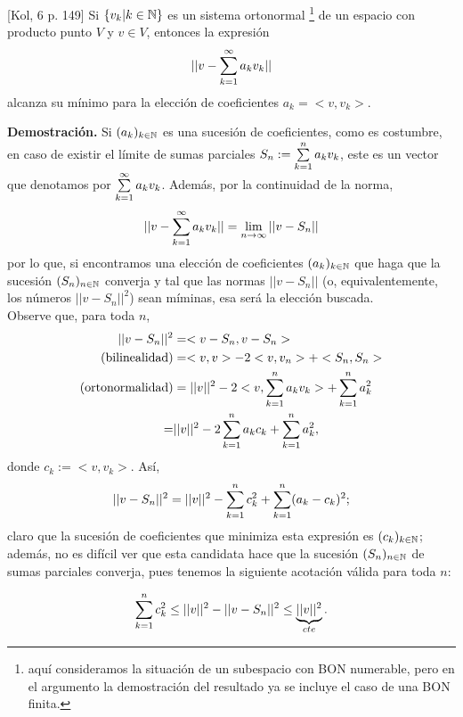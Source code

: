 \begin{teo} \label{teo: Kol 6, p.149}
[Kol, 6 p. 149] Si $\{ v_{k} |k \in \mathbb{N} \}$ es un sistema
ortonormal \footnote{aquí consideramos la situación de un subespacio
con BON numerable, pero en el argumento la demostración del resultado ya
se incluye el caso de una BON finita.} de un espacio con producto
punto $V$ y $v \in V$, entonces la expresión
\[
|| v - \sum\limits_{k=1}^{\infty}a_{k}v_{k}  ||
\]
alcanza su mínimo para la elección de coeficientes
$a_{k}= <v , v_{k} > $.
\end{teo}

\noindent
\textbf{Demostración.}
Si $(a_{k})_{k \in \mathbb{N}}$ es una sucesión de coeficientes,
como es costumbre,
en caso de existir el límite de sumas parciales
$S_{n}:= \sum\limits_{k=1}^{n}a_{k}v_{k}$, este es un vector que denotamos
por $\sum\limits_{k=1}^{\infty}a_{k}v_{k}$. Además,
por la continuidad de la norma,
\[
||v - \sum\limits_{k=1}^{\infty}a_{k}v_{k} || = \lim\limits_{n \rightarrow \infty }{||v-S_{n}||}
\]
por lo que, si encontramos una elección de coeficientes $(a_{k})_{k \in \mathbb{N}}$
que haga que
la sucesión $(S_{n})_{n \in \mathbb{N}}$ converja y tal que las normas
$||v-S_{n}||$ (o, equivalentemente, los números $||v-S_{n}||^{2}$)
sean míminas, esa será la elección buscada. \\
Observe que, para toda $n$,
\begin{align*}
||v-S_{n}||^{2} & = <v-S_{n} , v-S_{n} > \\
\text{(bilinealidad)} & =  <v, v > - 2 < v , v_{n} > + <S_{n} , S_{n}  > \\
\text{(ortonormalidad)} & =  ||v||^{2} - 2 < v ,\sum\limits_{k=1}^{n}a_{k}v_{k} > + 
\sum\limits_{k=1}^{n}a_{k}^{2} \\
= & ||v||^{2} - 2\sum\limits_{k=1}^{n}a_{k}c_{k}  + 
\sum\limits_{k=1}^{n}a_{k}^{2},
\end{align*}
donde $c_{k}:= < v , v_{k} >$. Así,
\[
||v-S_{n}||^{2} = ||v||^{2} - \sum\limits_{k=1}^{n}c_{k}^{2}  + 
\sum\limits_{k=1}^{n}(a_{k}-c_{k})^{2};
\]
claro que la sucesión de coeficientes que minimiza
esta expresión es $(c_{k})_{k \in \mathbb{N}}$; además, no es difícil ver
que esta candidata hace que la sucesión $(S_{n})_{n \in \mathbb{N}}$
de sumas parciales converja, pues tenemos la siguiente acotación
válida para toda $n$:

\begin{equation} \label{ecuacion teor kolmogorov}
\sum\limits_{k=1}^{n}c_{k}^{2} \leq ||v||^{2}-||v-S_{n}||^{2} \leq 
\underbrace{||v||^{2}}_{cte}.
\end{equation}

\QEDB
\vspace{0.2cm}


